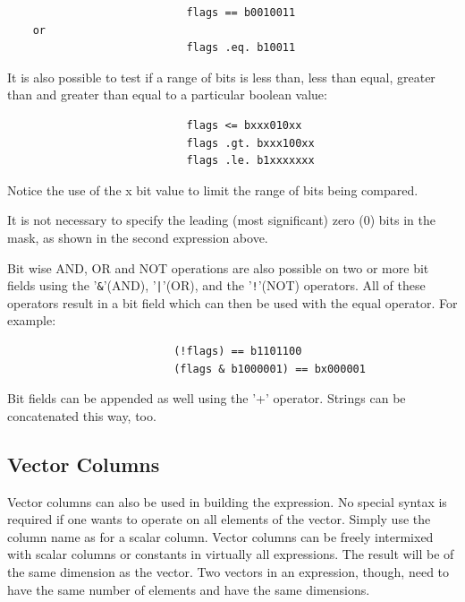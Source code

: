 \documentclass[11pt]{book}
\begin{document}
\begin{verbatim}
                            flags == b0010011
    or
                            flags .eq. b10011
\end{verbatim}

    It is also possible to test if a range of bits is  less  than,  less
    than  equal,  greater  than  and  greater than equal to a particular
    boolean value:


\begin{verbatim}
                            flags <= bxxx010xx
                            flags .gt. bxxx100xx
                            flags .le. b1xxxxxxx
\end{verbatim}

    Notice the use of the x bit value to limit the range of  bits  being
    compared.

    It  is  not necessary to specify the leading (most significant) zero
    (0) bits in the mask, as shown in the second expression above.

    Bit wise AND, OR and NOT operations are  also  possible  on  two  or
    more  bit  fields  using  the  '\verb+&+'(AND),  '\verb+|+'(OR),  and the '\verb+!+'(NOT)
    operators. All of these operators result in a bit  field  which  can
    then be used with the equal operator. For example:


\begin{verbatim}
                          (!flags) == b1101100
                          (flags & b1000001) == bx000001
\end{verbatim}

    Bit  fields can be appended as well using the '+' operator.  Strings
    can be concatenated this way, too.


\subsection{Vector Columns}

    Vector columns can also be used  in  building  the  expression.   No
    special  syntax  is required if one wants to operate on all elements
    of the vector.  Simply use the column name as for a  scalar  column.
    Vector  columns  can  be  freely  intermixed  with scalar columns or
    constants in virtually all expressions.  The result will be  of  the
    same dimension as the vector.  Two vectors in an expression, though,
    need to  have  the  same  number  of  elements  and  have  the  same
    dimensions.
\end{document}
